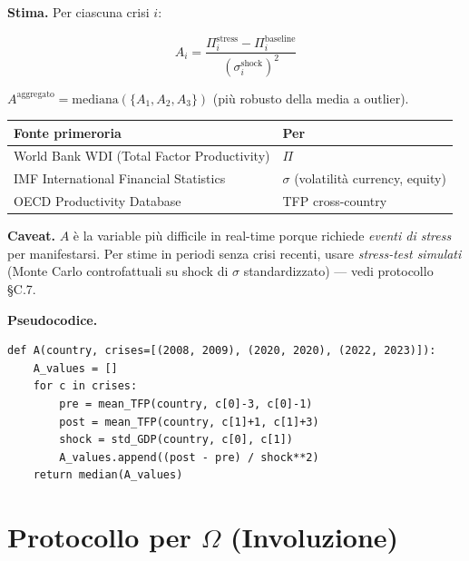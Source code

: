 \Hypoth{} \textbf{Stima.} Per ciascuna crisi \(i\):

\[
A_i = \frac{\Pi^{\text{stress}}_i - \Pi^{\text{baseline}}_i}{(\sigma^{\text{shock}}_i)^2}
\]

\(A^{\text{aggregato}} = \text{mediana}(\{A_1, A_2, A_3\})\) (più
robusto della media a outlier).

{\def\LTcaptype{none} %
{\small\begin{longtable}[]{@{}
  >{\raggedright\arraybackslash}p{}
  >{\raggedright\arraybackslash}p{}@{}}
\toprule\noalign{}
\begin{minipage}[b]{\linewidth}\raggedright
Fonte primeroria
\end{minipage} & \begin{minipage}[b]{\linewidth}\raggedright
Per
\end{minipage} \\
\midrule\noalign{}
\endhead
\bottomrule\noalign{}
\endlastfoot
World Bank WDI (Total Factor Productivity) & \(\Pi\) \\
IMF International Financial Statistics & \(\sigma\) (volatilità
currency, equity) \\
OECD Productivity Database & TFP cross-country \\
\end{longtable}}
}

\Conj{} \textbf{Caveat.} \(A\) è la variable più difficile in real-time
porque richiede \emph{eventi di stress} per manifestarsi. Per stime in
periodi senza crisi recenti, usare \emph{stress-test simulati} (Monte
Carlo controfattuali su shock di \(\sigma\) standardizzato) --- vedi
protocollo \S{}C.7.

\Hypoth{} \textbf{Pseudocodice.}

\begin{verbatim}
def A(country, crises=[(2008, 2009), (2020, 2020), (2022, 2023)]):
    A_values = []
    for c in crises:
        pre = mean_TFP(country, c[0]-3, c[0]-1)
        post = mean_TFP(country, c[1]+1, c[1]+3)
        shock = std_GDP(country, c[0], c[1])
        A_values.append((post - pre) / shock**2)
    return median(A_values)
\end{verbatim}



\section{\texorpdfstring{Protocollo per \(\Omega\)
(Involuzione)}{Protocollo per \textbackslash Omega (Involuzione)}}\label{protocollo-per-omega-involución}

